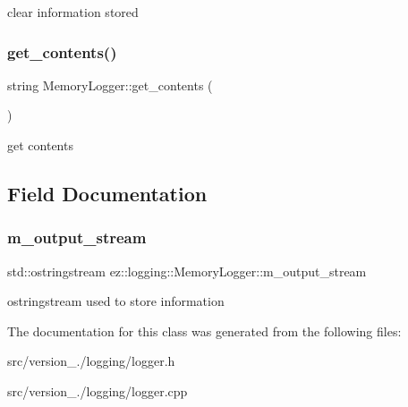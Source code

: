 clear information stored \mbox{\label{classez_1_1logging_1_1MemoryLogger_aa4f77cc6ac0e272ce749b9bb4b939840}} 
\subsubsection{\texorpdfstring{get\+\_\+contents()}{get\_contents()}}
{\footnotesize\ttfamily string Memory\+Logger\+::get\+\_\+contents (\begin{DoxyParamCaption}{ }\end{DoxyParamCaption})}

get contents 

\subsection{Field Documentation}
\mbox{\label{classez_1_1logging_1_1MemoryLogger_a45fc2a111c72be27408aef6c7a466dc0}} 
\subsubsection{\texorpdfstring{m\+\_\+output\+\_\+stream}{m\_output\_stream}}
{\footnotesize\ttfamily std\+::ostringstream ez\+::logging\+::\+Memory\+Logger\+::m\+\_\+output\+\_\+stream\hspace{0.3cm}{\ttfamily [protected]}}

ostringstream used to store information 

The documentation for this class was generated from the following files\+:\begin{DoxyCompactItemize}
\item 
src/version\+\_./logging/logger.\+h\item 
src/version\+\_./logging/logger.\+cpp\end{DoxyCompactItemize}
